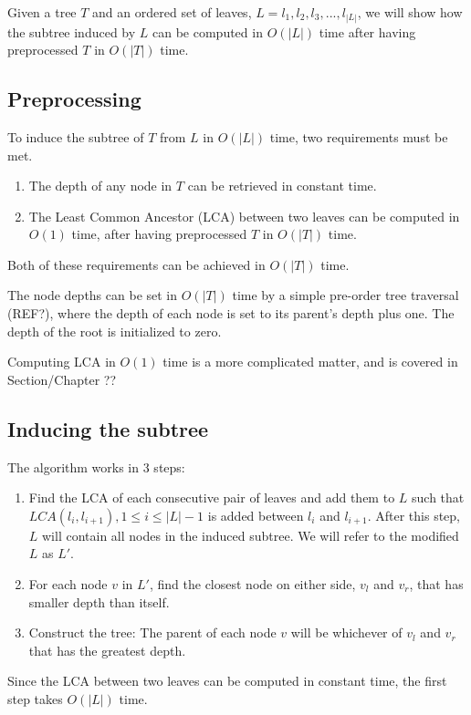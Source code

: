 Given a tree $T$ and an ordered set of leaves, $L=l_1,l_2,l_3,...,l_{|L|}$, we will show how the subtree induced by $L$ can be computed in $O(|L|)$ time after having preprocessed $T$ in $O(|T|)$ time.

\subsection{Preprocessing}
To induce the subtree of $T$ from $L$ in $O(|L|)$ time, two requirements must be met.
\begin{enumerate}
	\item The depth of any node in $T$ can be retrieved in constant time.
	\item The Least Common Ancestor (LCA) between two leaves can be computed in $O(1)$ time, after having preprocessed $T$ in $O(|T|)$ time.
\end{enumerate}

Both of these requirements can be achieved in $O(|T|)$ time.

The node depths can be set in $O(|T|)$ time by a simple pre-order tree traversal (REF?), where the depth of each node is set to its parent's depth plus one. The depth of the root is initialized to zero.  

Computing LCA in $O(1)$ time is a more complicated matter, and is covered in Section/Chapter ??

\subsection{Inducing the subtree}
The algorithm works in 3 steps:
\begin{enumerate}
	\item Find the LCA of each consecutive pair of leaves and add them to $L$ such that $LCA(l_i,l_{i+1}), 1 \le i \le |L|-1$ is added between $l_i$ and $l_{i+1}$.
	\subitem After this step, $L$ will contain all nodes in the induced subtree.
	\subitem We will refer to the modified $L$ as $L'$.
	\item For each node $v$ in $L'$, find the closest node on either side, $v_l$ and $v_r$, that has smaller depth than itself.
	\item Construct the tree: The parent of each node $v$ will be whichever of $v_l$ and $v_r$ that has the greatest depth.
\end{enumerate}

Since the LCA between two leaves can be computed in constant time, the first step takes $O(|L|)$ time.

